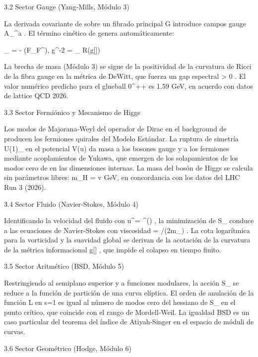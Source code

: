\documentclass[12pt,a4paper]{book}
\begin{document}
3.2 Sector Gauge (Yang‑Mills, Módulo 3)

La derivada covariante de  \sqrt{\rho}  sobre un fibrado principal  G  introduce campos gauge  A_\mu^a . El término cinético de  \rho  genera automáticamente:

_{} = - (F_{\mu\nu}F^{\mu\nu}), \quad g^{-2} = \int_{}  R(g[\rho])

La brecha de masa (Módulo 3) se sigue de la positividad de la curvatura de Ricci de la fibra gauge en la métrica de DeWitt, que fuerza un gap espectral  \Delta > 0 . El valor numérico predicho para el glueball  0^{++}  es  1.59   GeV, en acuerdo con datos de lattice QCD 2026.

3.3 Sector Fermiónico y Mecanismo de Higgs

Los modos de Majorana‑Weyl del operador de Dirac en el background de  \rho  producen los fermiones quirales del Modelo Estándar. La ruptura de simetría  U(1)_{}  en el potencial  V(u)  da masa a los bosones gauge y a los fermiones mediante acoplamientos de Yukawa, que emergen de los solapamientos de los modos cero de  \rho  en las dimensiones internas. La masa del bosón de Higgs se calcula sin parámetros libres:  m_H = \sqrt{2\lambda}v   GeV, en concordancia con los datos del LHC Run 3 (2026).

3.4 Sector Fluido (Navier‑Stokes, Módulo 4)

Identificando la velocidad del fluido con  u^\mu = \partial^\mu \arg(\rho) , la minimización de  S_{}  conduce a las ecuaciones de Navier‑Stokes con viscosidad  \nu = \hbar/(2m_{}) . La cota logarítmica para la vorticidad y la suavidad global se derivan de la acotación de la curvatura de la métrica informacional  g[\rho] , que impide el colapso en tiempo finito.

3.5 Sector Aritmético (BSD, Módulo 5)

Restringiendo    al semiplano superior y  \rho  a funciones modulares, la acción  S_{}  se reduce a la función de partición de una curva elíptica. El orden de anulación de la función L en  s=1  es igual al número de modos cero del hessiano de  S_{}  en el punto crítico, que coincide con el rango de Mordell‑Weil. La igualdad BSD es un caso particular del teorema del índice de Atiyah‑Singer en el espacio de móduli de curvas.

3.6 Sector Geométrico (Hodge, Módulo 6)
\end{document}
